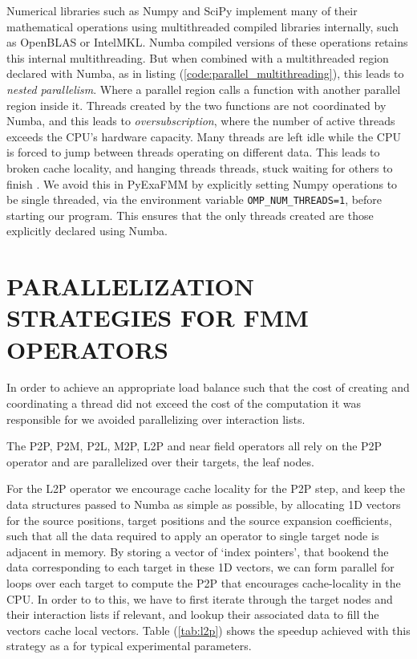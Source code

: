 \documentclass{IEEEcsmag}
\begin{document}
Numerical libraries such as Numpy and SciPy implement many of their mathematical operations using multithreaded compiled libraries internally, such as OpenBLAS or IntelMKL. Numba compiled versions of these operations retains this internal multithreading. But when combined with a multithreaded region declared with Numba, as in listing (\ref{code:parallel_multithreading}), this leads to \textit{nested parallelism}. Where a parallel region calls a function with another parallel region inside it. Threads created by the two functions are not coordinated by Numba, and this leads to \textit{oversubscription}, where the number of active threads exceeds the CPU's hardware capacity. Many threads are left idle while the CPU is forced to jump between threads operating on different data. This leads to broken cache locality, and hanging threads threads, stuck waiting for others to finish \cite{Malakhov2016}. We avoid this in PyExaFMM by explicitly setting Numpy operations to be single threaded, via the environment variable \lstinline{OMP_NUM_THREADS=1}, before starting our program. This ensures that the only threads created are those explicitly declared using Numba.



\section{PARALLELIZATION STRATEGIES FOR FMM OPERATORS}

In order to achieve an appropriate load balance such that the cost of creating and coordinating a thread did not exceed the cost of the computation it was responsible for we avoided parallelizing over interaction lists.

The P2P, P2M, P2L, M2P, L2P and near field operators all rely on the P2P operator and are parallelized over their targets, the leaf nodes.

For the L2P operator we encourage cache locality for the P2P step, and keep the data structures passed to Numba as simple as possible, by allocating 1D vectors for the source positions, target positions and the source expansion coefficients, such that all the data required to apply an operator to single target node is adjacent in memory. By storing a vector of `index pointers', that bookend the data corresponding to each target in these 1D vectors, we can form parallel for loops over each target to compute the P2P that encourages cache-locality in the CPU. In order to to this, we have to first iterate through the target nodes and their interaction lists if relevant, and lookup their associated data to fill the vectors cache local vectors. Table (\ref{tab:l2p}) shows the speedup achieved with this strategy as a for typical experimental parameters.
\end{document}
